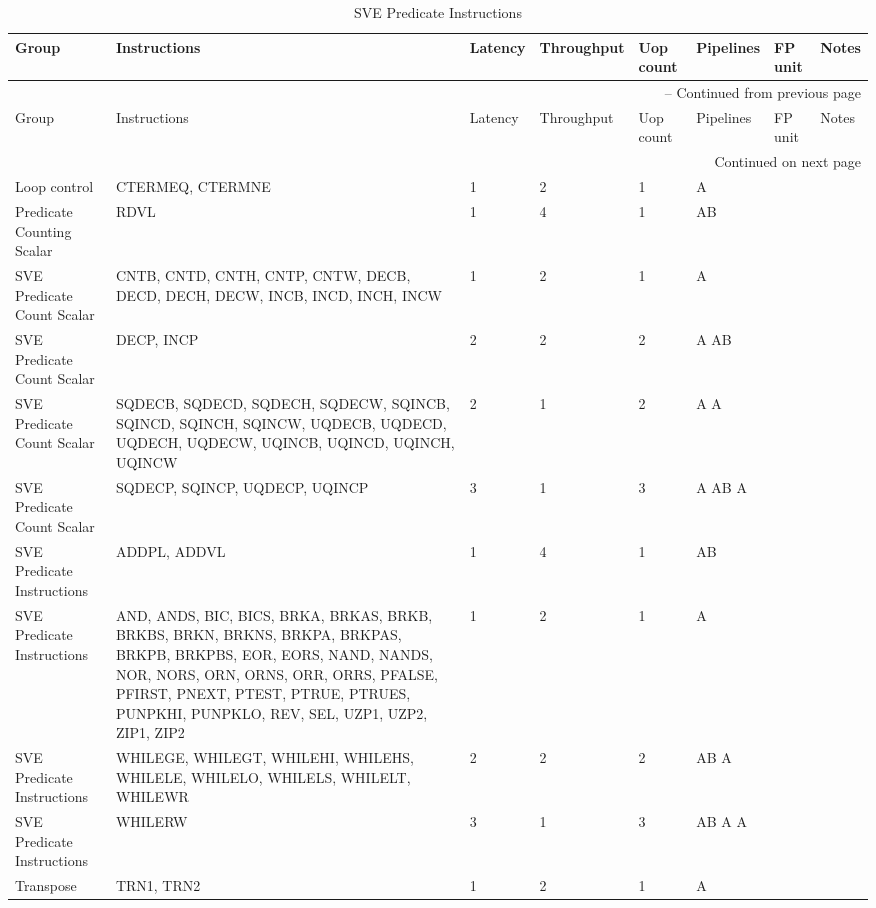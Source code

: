 \begin{longtable}{|p{1in}|p{1in}|l|l|l|p{1in}|l|p{1in}|}
\caption{SVE Predicate Instructions} \\
\hline
Group & Instructions & Latency & Throughput & Uop count & Pipelines & FP unit & Notes\\
\hline
\endfirsthead
\hline
\multicolumn{8}{|r|}{{\tablename\ \thetable{} -- Continued from previous page}} \\
\hline
Group & Instructions & Latency & Throughput & Uop count & Pipelines & FP unit & Notes\\
\hline
\endhead
\hline
\multicolumn{8}{|r|}{{Continued on next page}} \\
\hline
\endfoot
\hline
\endlastfoot
Loop control & CTERMEQ, CTERMNE & 1 & 2 & 1 & A &  & \\
\hline
Predicate Counting Scalar & RDVL & 1 & 4 & 1 & AB &  & \\
\hline
SVE Predicate Count Scalar & CNTB, CNTD, CNTH, CNTP, CNTW, DECB, DECD, DECH, DECW, INCB, INCD, INCH, INCW & 1 & 2 & 1 & A &  & \\
\hline
SVE Predicate Count Scalar & DECP, INCP & 2 & 2 & 2 & A AB &  & \\
\hline
SVE Predicate Count Scalar & SQDECB, SQDECD, SQDECH, SQDECW, SQINCB, SQINCD, SQINCH, SQINCW, UQDECB, UQDECD, UQDECH, UQDECW, UQINCB, UQINCD, UQINCH, UQINCW & 2 & 1 & 2 & A A &  & \\
\hline
SVE Predicate Count Scalar & SQDECP, SQINCP, UQDECP, UQINCP & 3 & 1 & 3 & A AB A &  & \\
\hline
SVE Predicate Instructions & ADDPL, ADDVL & 1 & 4 & 1 & AB &  & \\
\hline
SVE Predicate Instructions & AND, ANDS, BIC, BICS, BRKA, BRKAS, BRKB, BRKBS, BRKN, BRKNS, BRKPA, BRKPAS, BRKPB, BRKPBS, EOR, EORS, NAND, NANDS, NOR, NORS, ORN, ORNS, ORR, ORRS, PFALSE, PFIRST, PNEXT, PTEST, PTRUE, PTRUES, PUNPKHI, PUNPKLO, REV, SEL, UZP1, UZP2, ZIP1, ZIP2 & 1 & 2 & 1 & A &  & \\
\hline
SVE Predicate Instructions & WHILEGE, WHILEGT, WHILEHI, WHILEHS, WHILELE, WHILELO, WHILELS, WHILELT, WHILEWR & 2 & 2 & 2 & AB A &  & \\
\hline
SVE Predicate Instructions & WHILERW & 3 & 1 & 3 & AB A A &  & \\
\hline
Transpose & TRN1, TRN2 & 1 & 2 & 1 & A &  & \\
\hline
\end{longtable}
\newpage
